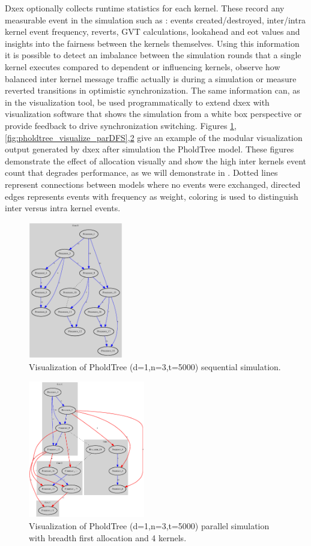 Dxex optionally collects runtime statistics for each kernel. These record any measurable event in the simulation such as : events created/destroyed, inter/intra kernel event frequency, reverts, GVT calculations, lookahead and eot values and insights into the fairness between the kernels themselves. Using this information it is possible to detect an imbalance between the simulation rounds that a single kernel executes compared to dependent or influencing kernels, observe how balanced inter kernel message traffic actually is during a simulation or measure reverted transitions in optimistic synchronization.
The same information can, as in the visualization tool, be used programmatically to extend dxex with visualization software that shows the simulation from a white box perspective or provide feedback to drive synchronization switching.
Figures \ref{fig:pholdtree_visualize_seq},\ref{fig:pholdtree_visualize_parDFS},\ref{fig:pholdtree_visualize_parBFS} give an example of the modular visualization output generated by dxex after simulation the PholdTree model. These figures demonstrate the effect of allocation visually and show the high inter kernels event count that degrades performance, as we will demonstrate in 
 . Dotted lines represent connections between models where no events were exchanged, directed edges represents events with frequency as weight, coloring is used to distinguish inter versus intra kernel events.
\begin{figure}
	\center
	\includegraphics[width=\plotfraction\columnwidth, height=6cm, keepaspectratio]{fig/pholdtreed1n3t5000.eps}
	\caption{Visualization of PholdTree (d=1,n=3,t=5000) sequential simulation.}
	\label{fig:pholdtree_visualize_seq}
\end{figure}
\begin{figure}
	\center
	\includegraphics[width=\plotfraction\columnwidth,  height=6cm, keepaspectratio]{fig/pholdtreed1n3t5000c4BFS.eps}
	\caption{Visualization of PholdTree (d=1,n=3,t=5000) parallel simulation with breadth first allocation and 4 kernels.}
	\label{fig:pholdtree_visualize_parBFS}
\end{figure}
